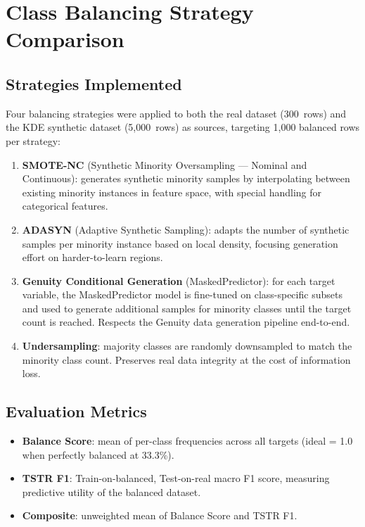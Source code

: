 \documentclass[12pt,a4paper]{article}
\begin{document}
\section{Class Balancing Strategy Comparison}

\subsection{Strategies Implemented}

Four balancing strategies were applied to both the real dataset (300~rows) and the KDE synthetic dataset (5,000~rows) as sources, targeting 1,000 balanced rows per strategy:

\begin{enumerate}[leftmargin=1.5cm]
  \item \textbf{SMOTE-NC} (Synthetic Minority Oversampling --- Nominal and Continuous): generates synthetic minority samples by interpolating between existing minority instances in feature space, with special handling for categorical features.
  \item \textbf{ADASYN} (Adaptive Synthetic Sampling): adapts the number of synthetic samples per minority instance based on local density, focusing generation effort on harder-to-learn regions.
  \item \textbf{Genuity Conditional Generation} (MaskedPredictor): for each target variable, the MaskedPredictor model is fine-tuned on class-specific subsets and used to generate additional samples for minority classes until the target count is reached. Respects the Genuity data generation pipeline end-to-end.
  \item \textbf{Undersampling}: majority classes are randomly downsampled to match the minority class count. Preserves real data integrity at the cost of information loss.
\end{enumerate}

\subsection{Evaluation Metrics}

\begin{itemize}[noitemsep]
  \item \textbf{Balance Score}: mean of per-class frequencies across all targets (ideal = 1.0 when perfectly balanced at 33.3\%).
  \item \textbf{TSTR F1}: Train-on-balanced, Test-on-real macro F1 score, measuring predictive utility of the balanced dataset.
  \item \textbf{Composite}: unweighted mean of Balance Score and TSTR F1.
\end{itemize}
\end{document}
